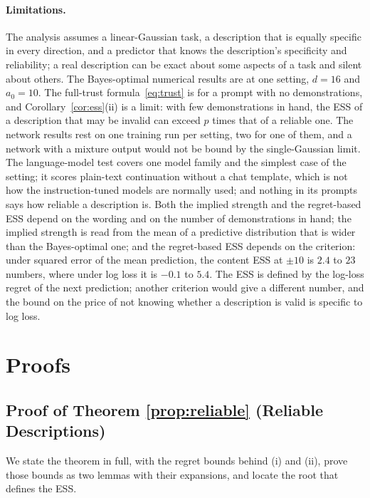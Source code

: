\documentclass[10pt]{article}
\begin{document}
\paragraph{Limitations.} The analysis assumes a linear-Gaussian task, a description that is equally specific in every direction, and a predictor that knows the description's specificity and reliability; a real description can be exact about some aspects of a task and silent about others. The Bayes-optimal numerical results are at one setting, $d = 16$ and $a_0 = 10$. The full-trust formula~\eqref{eq:trust} is for a prompt with no demonstrations, and Corollary~\ref{cor:ess}(ii) is a limit: with few demonstrations in hand, the ESS of a description that may be invalid can exceed $p$ times that of a reliable one. The network results rest on one training run per setting, two for one of them, and a network with a mixture output would not be bound by the single-Gaussian limit. The language-model test covers one model family and the simplest case of the setting; it scores plain-text continuation without a chat template, which is not how the instruction-tuned models are normally used; and nothing in its prompts says how reliable a description is. Both the implied strength and the regret-based ESS depend on the wording and on the number of demonstrations in hand; the implied strength is read from the mean of a predictive distribution that is wider than the Bayes-optimal one; and the regret-based ESS depends on the criterion: under squared error of the mean prediction, the content ESS at $\pm 10$ is $2.4$ to $23$ numbers, where under log loss it is $-0.1$ to $5.4$. The ESS is defined by the log-loss regret of the next prediction; another criterion would give a different number, and the bound on the price of not knowing whether a description is valid is specific to log loss.




\clearpage
\appendix
\section{Proofs}

\subsection{Proof of Theorem \ref{prop:reliable} (Reliable Descriptions)}\label{app:specificity}
We state the theorem in full, with the regret bounds behind (i) and (ii), prove those bounds as two lemmas with their expansions, and locate the root that defines the ESS.
\end{document}
